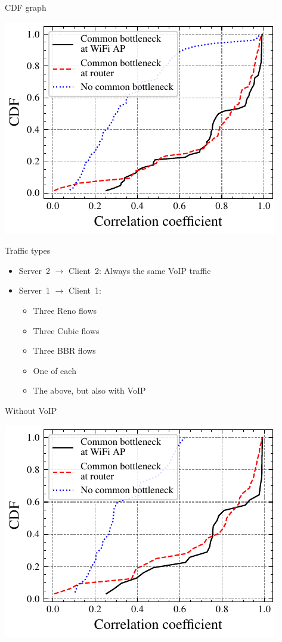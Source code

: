\documentclass[presentation]{beamer}
\begin{document}
\begin{frame}[label={sec:orgc68c5c5}]{CDF graph}
\begin{center}
\includegraphics[width=.9\linewidth]{figures/results/all-over2-no-only-video.pdf}
\end{center}
\end{frame}
\begin{frame}[label={sec:org1501fd3}]{Traffic types}


\begin{itemize}
\item Server~2 \(\to\) Client~2: Always the same VoIP traffic
\item Server~1 \(\to\) Client~1:
\begin{itemize}
\item Three Reno flows
\item Three Cubic flows
\item Three BBR flows
\item One of each
\item The above, but also with VoIP
\end{itemize}
\end{itemize}
\end{frame}
\begin{frame}[label={sec:org9e8bf03}]{Without VoIP}
\begin{center}
\includegraphics[width=.9\linewidth]{figures/results/all-over2-no-video.pdf}
\end{center}
\end{frame}
\end{document}
